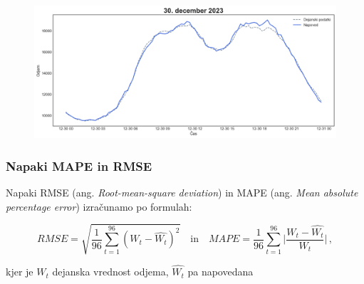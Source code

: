 \documentclass[14p, hyperref={unicode}]{beamer}
\begin{document}
\begin{frame}
\begin{figure}[!ht]
\begin{minipage}[c]{0.48\linewidth}
        \end{minipage}
        \hfill
        \begin{minipage}[c]{0.48\linewidth}
            \includegraphics[width=\linewidth]{napoved_4.png}
        \end{minipage}
    \end{figure}

\end{frame}




\begin{frame}
    
    \frametitle{Napaki MAPE in RMSE} 

    Napaki RMSE (ang. \emph{Root-mean-square deviation}) in 
    MAPE (ang. \emph{Mean absolute percentage error}) izračunamo po formulah:
    
    $$
    RMSE = \sqrt{\frac{1}{96}\sum_{t=1}^{96}{(W_t-\hat{W_t})^2}} \quad \textrm{in} \quad
    MAPE = \frac{1}{96}\sum_{t=1}^{96}{\lvert \frac{W_t-\hat{W_t}}{W_t} \rvert} \,,
    $$
    
    \noindent kjer je $W_t$ dejanska vrednost odjema, $\hat{W_t}$ pa napovedana

\end{frame}


\end{document}
